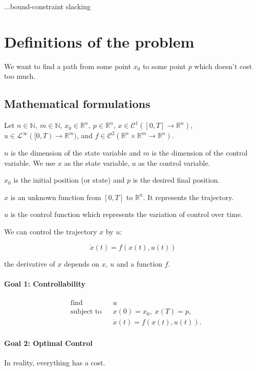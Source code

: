 \documentclass{report}
\begin{document}
...bound-constraint slacking


\chapter{Definitions of the problem}
We want to find a path from some point $x_0$ to some point $p$ which doesn't cost too much.

\section{Mathematical formulations}
Let $n\in \mathbb{N}, \ m \in \mathbb{N}$, $x_0\in \mathbb{R}^n, \ p \in \mathbb{R}^n$, $x \in \mathscr{C}^1([0, T] \to \mathbb{R}^n)$, $u \in \mathscr{L}^\infty([0, T) \to \mathbb{R}^m)$, and $f \in  \mathscr{C}^2(\mathbb{R}^n \times \mathbb{R}^m \to \mathbb{R}^n)$. 

$n$ is the dimension of the state variable and $m$ is the dimension of the control variable. We use $x$ as the state variable, $u$ as the control variable.

$x_0$ is the initial position (or state) and $p$ is the desired final position.

$x$ is an unknown function from $[0, T]$ to $\mathbb{R}^n$. It represents the trajectory.

$u$ is the control function which represents the variation of control over time.

We can control the trajectory $x$ by $u$: 

\begin{equation}
\dot{x} (t) = f(x(t), u(t))
\end{equation}

the derivative of $x$ depends on $x$, $u$ and a function $f$. 



\subsubsection{Goal 1: Controllability}

\begin{equation}
\begin{aligned}
& {\text{find}}
& & u \\
& \text{subject to}
& & x(0) = x_0, \; x(T) = p, \\
&&& \dot{x} (t) = f(x(t), u(t)).
\end{aligned}
\end{equation}

\subsubsection{Goal 2: Optimal Control}
In reality, everything has a cost.
\end{document}
